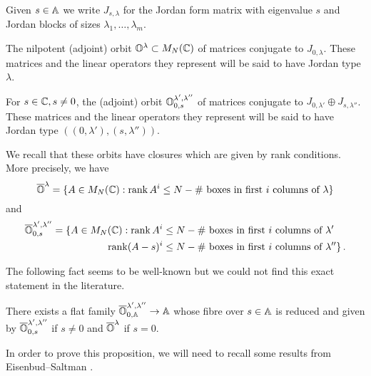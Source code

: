 \documentclass{article} %
\begin{document}
Given $ s \in \AA$ we write $ J_{s,\lambda}$ for the Jordan form matrix with eigenvalue $ s$ and Jordan blocks of sizes $ \lambda_1, \dots, \lambda_m$.
    
\begin{definition}
\label{def:Olam}
The nilpotent (adjoint) orbit $ \OO^\lambda \subset M_N(\CC)$ of matrices conjugate to $ J_{0,\lambda}$. These matrices and the linear operators they represent will be said to have Jordan type $\lambda$.
\end{definition}  
% 
% 
\begin{definition}
\label{def:Olamlam}
    For $ s \in \CC, s \ne 0$, the (adjoint) orbit $ \OO^{\lambda', \lambda''}_{0,s}$ of matrices conjugate to $ J_{0,\lambda'} \oplus J_{s,\lambda''}$.
    These matrices and the linear operators they represent will be said to have Jordan type $((0,\lambda'), (s,\lambda''))$.
\end{definition}  
% 

% 

     
We recall that these orbits have closures which are given by rank conditions.  
More precisely, we have
$$
    \overline{\OO}^\lambda = \{ A \in M_N(\CC) : \rk A^i \le N - \#\text{~boxes in first $i$ columns of }\lambda \}
$$
and
\begin{equation} 
\label{eq:ranks}
\begin{split}
    \overline{\OO}^{\lambda', \lambda''}_{0,s} = \{ A \in M_N(\CC) : \rk A^i &\le N - 
    \#\text{~boxes in first $i$ columns of }\lambda' \\
    \rk (A-s)^i &\le N - \#\text{~boxes in first $i$ columns of }\lambda'' \}\,. 
\end{split}
\end{equation}
%  

The following fact seems to be well-known but we could not find this exact statement in the literature.
\begin{proposition} 
    \label{prop:adjoint}
    There exists a flat family $\overline{\OO}^{\lambda', \lambda''}_{0,\AA} \rightarrow \AA$ whose fibre over $s \in \AA$ is reduced and given by $\overline{\OO}^{\lambda', \lambda''}_{0,s}$ if $s \ne 0 $ and $\overline{\OO}^\lambda $ if $ s = 0$.
\end{proposition}
% 
In order to prove this proposition, we will need to recall some results from Eisenbud--Saltman \cite{eisenbud1989rank}. 
% 
\end{document}

